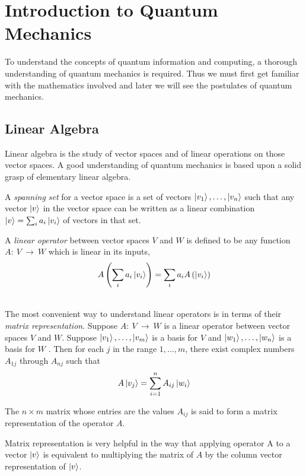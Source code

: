 \section{Introduction to Quantum Mechanics}
To understand the concepts of quantum information and computing, a thorough understanding of quantum mechanics is required. Thus we must first get familiar with the mathematics involved and later we will see the postulates of quantum mechanics.

\subsection{Linear Algebra}
Linear algebra is the study of vector spaces and of linear operations on those vector spaces. A good understanding of quantum mechanics is based upon a solid grasp of elementary linear algebra.
\begin{definition}
    A \textit{spanning set} for a vector space is a set of vectors $\ket{v_1},\ldots,\ket{v_n}$ such that any vector $\ket{v}$ in the vector space can be written as a linear combination $\ket{v} = \sum_{i}{a_i\ket{v_i}}$ of vectors in that set. 
\end{definition}
\begin{definition}
    A \textit{linear operator} between vector spaces $V$ and $W$ is defined to be any function $A \colon\ V\ \rightarrow\ W$ which is linear in its inputs, $$A\left(\sum_{i}{a_i\ket{v_i}}\right)=\sum_{i}{a_iA\left(\ket{v_i}\right)}$$
\end{definition}
\\
The most convenient way to understand linear operators is in terms of their \textit{matrix representation}. Suppose $A \colon\ V\ \rightarrow\ W$ is a linear operator between vector spaces $V$ and $W$. Suppose $\ket{v_1},\ldots,\ket{v_m}$ is a basis for $V$ and $\ket{w_1},\ldots,\ket{w_n}$ is a basis for $W$ . Then for each $j$ in the range $1,\ldots,m$, there exist complex numbers $A_{1j}$ through $A_{nj}$ such that
    $$A\ket{v_j} = \sum_{i = 1}^{n}{A_{ij}\ket{w_i}}$$

The $n\times m$ matrix whose entries are the values $A_{ij}$ is said to form a matrix representation of the operator $A$.

Matrix representation is very helpful in the way that applying operator A to a vector $\ket{v}$ is equivalent to multiplying the matrix of $A$ by the column vector representation of $\ket{v}$.

